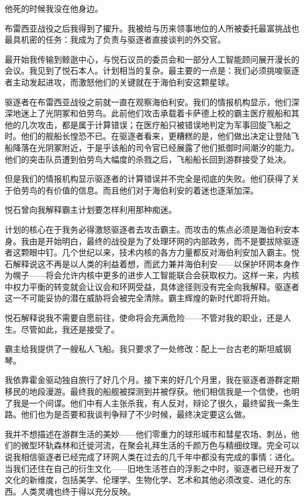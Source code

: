 \documentclass[AutoFakeBold=true]{book}
\begin{document}
{他死的时候我没在他身边。

布雷西亚战役之后我得到了擢升。我被给与历来领事地位的人所被委托最富挑战也最具机密的任务：我成为了负责与驱逐者直接谈判的外交官。

最开始我传输到鲸逖中心，与悦石议员的委员会和一部分人工智能顾问展开漫长的会议。我见到了悦石本人。计划相当的复杂。最主要的一点是：我们必须挑唆驱逐者主动发起进攻，而激怒他们的关键就在于海伯利安这颗星球。

驱逐者在布雷西亚战役之前就一直在观察海伯利安。我们的情报机构显示，他们深深地迷上了光阴冢和伯劳鸟。此前他们攻击承载着卡萨德上校的霸主医疗舰船和其他的几次攻击，都是属于计算错误；在医疗船只被错误地判定为军事回旋飞船之时。他们的舰船长惶恐不已。在驱逐者看来，更糟糕的是，他们做出决定让登陆飞船降落在光阴冢附近，于是乎该船的司令官已经展露了他们抵御时间潮汐的能力。他们的突击队员遭到伯劳鸟大幅度的杀戮之后，飞船船长回到游群接受了处决。

但是我们的情报机构显示驱逐者的计算错误并不完全是彻底的失败。他们获得了关于伯劳鸟的有价值的信息。而且他们对于海伯利安的着迷也逐渐加深。

悦石曾向我解释霸主计划要怎样利用那种痴迷。

计划的核心在于我务必得激怒驱逐者去攻击霸主。而攻击的焦点必须是海伯利安本身。我由是开始明白，最终的战役是为了处理环网的内部政务，而不是要拔除驱逐者这颗眼中钉。几个世纪以来，技术内核的各方力量都反对海伯利安加入霸主。悦石解释说这不再是以人类的利益着想，而武力兼并海伯利安——以保护环网本身作为幌子——将会允许内核中更多的进步人工智能联合会获取权力。这样一来，内核中权力平衡的转变就会让议会和环网受益，具体途径则没有完全向我解释。驱逐者这一不可能妥协的潜在威胁将会被完全清除。霸主辉煌的新时代即将开始。

悦石解释说我不需要自愿前往，使命将会充满危险——不管对我的职业，还是人生。尽管如此，我还是接受了。

霸主给我提供了一艘私人飞船。我只要求了一处修改：配上一台古老的斯坦威钢琴。

我依靠霍金驱动独自旅行了好几个月。接下来的好几个月里，我在驱逐者游群定期移民的地段漫游。最终我的船舰被探测到并被俘获。他们相信我是一个信使，也明了我是一个间谍。他们中有人主张杀我，有人反对，辩论了很久，最终留我一条生路。他们也为是否要和我谈判争辩了不少时候，最终决定要这么做。

我并不想描述在游群生活的美妙——他们零重力的球形城市和彗星农场、刺丛，他们的微型环轨森林和迁徙河流，在聚会礼拜生活的千颜万色与精细纹理。完全可以说我相信驱逐者已经完成了环网人类在过去的几千年中都没有完成的事情：进化。当我们还住在自己的衍生文化——旧地生活苍白的浮影之中时，驱逐者已经开发了文化的新维度，包括美学、伦理学、生物化学、艺术和其他必须改变、进化的东西。人类灵魂也终于得以充分反映。

}
\end{document}
